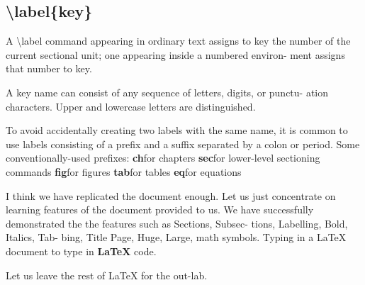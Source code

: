 \documentclass[12pt, a4paper]{article}
\begin{document}
\subsection{\textbackslash label\{key\}}

A \textbackslash label command appearing in ordinary text assigns to key the number
of the current sectional unit; one appearing inside a numbered environ-
ment assigns that number to key.
\par
A key name can consist of any sequence of letters, digits, or punctu-
ation characters. Upper and lowercase letters are distinguished.
\par
To avoid accidentally creating two labels with the same name, it is
common to use labels consisting of a prefix and a suffix separated by a
colon or period. Some conventionally-used prefixes:
\newline
{\bf ch}\qquad for chapters \newline
{\bf sec}\qquad for lower-level sectioning commands \newline
{\bf fig}\qquad for figures \newline
{\bf tab}\qquad for tables \newline
{\bf eq}\qquad for equations \newline

{\Huge I think we have replicated the document enough. Let us just concentrate on learning features of the
document provided to us. We have
successfully demonstrated the the
features such as Sections, Subsec-
tions, Labelling, Bold, Italics, Tab-
bing, Title Page, Huge, Large, math
symbols. Typing in a \LaTeX{} document
to type in \textbf{LaTeX} code.}
\newline
\par Let us leave the rest of \LaTeX{} for the out-lab.
\end{document}

